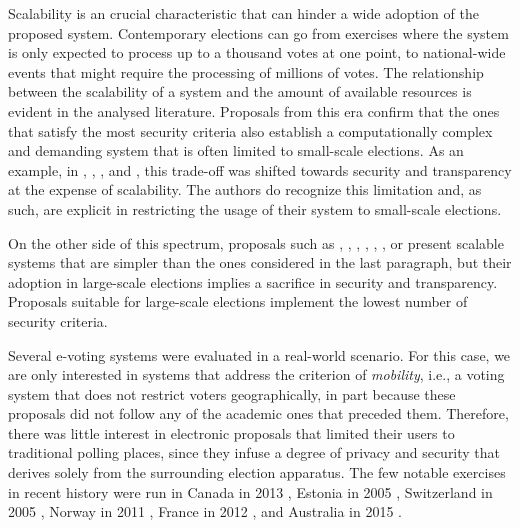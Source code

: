 \documentclass[../main.tex]{subfiles}
\begin{document}
\par
Scalability is an crucial characteristic that can hinder a wide adoption of the proposed system. Contemporary elections can go from exercises where the system is only expected to process up to a thousand votes at one point, to national-wide events that might require the processing of millions of votes. The relationship between the scalability of a system and the amount of available resources is evident in the analysed literature. Proposals from this era confirm that the ones that satisfy the most security criteria also establish a computationally complex and demanding system that is often limited to small-scale elections. As an example, in \cite{Cranor2002}, \cite{Nurmi1991}, \cite{Iversen1992}, and \cite{Niemi1999}, this trade-off was shifted towards security and transparency at the expense of scalability. The authors do recognize this limitation and, as such, are explicit in restricting the usage of their system to small-scale elections.
\par
On the other side of this spectrum, proposals such as \cite{Benaloh1994}, \cite{Benaloh1986a}, \cite{Park1994}, \cite{Juang2002}, \cite{Okamoto1996}, \cite{Okamoto1998}, \cite{Magkos2001} or \cite{Moran2006} present scalable systems that are simpler than the ones considered in the last paragraph, but their adoption in large-scale elections implies a sacrifice in security and transparency. Proposals suitable for large-scale elections implement the lowest number of security criteria.
\par
Several e-voting systems were evaluated in a real-world scenario. For this case, we are only interested in systems that address the criterion of \textit{mobility}, i.e., a voting system that does not restrict voters geographically, in part because these proposals did not follow any of the academic ones that preceded them. Therefore, there was little interest in electronic proposals that limited their users to traditional polling places, since they infuse a degree of privacy and security that derives solely from the surrounding election apparatus. The few notable exercises in recent history were run in Canada in 2013 \cite{Goodman2014}, Estonia in 2005 \cite{Heiberg2005}, Switzerland in 2005 \cite{Binder2019}, Norway in 2011 \cite{Barrat2012}, France in 2012 \cite{Pinault2012}, and Australia in 2015 \cite{Halderman2015}.
\par
\end{document}
